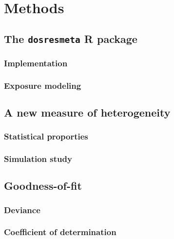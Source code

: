 \documentclass[11pt,a4paper,twoside,openany]{book}\usepackage{knitr}
\begin{document}
{\begin{itemize}
\end{itemize}



%

\chapter{Methods}

\section{The \texttt{dosresmeta} R package}

\subsection{Implementation}

\subsection{Exposure modeling}


\section{A new measure of heterogeneity}

\subsection{Statistical proporties}

\subsection{Simulation study}


\section{Goodness-of-fit}

\subsection{Deviance}

\subsection{Coefficient of determination}

}
\end{document}
